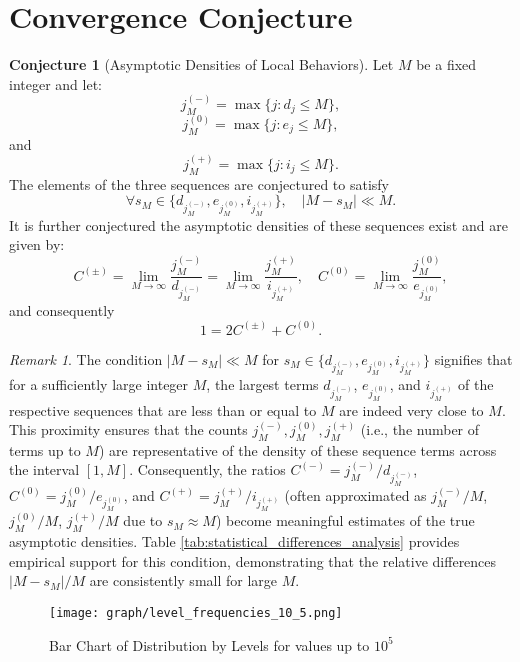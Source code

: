 \documentclass[]{article}
\theoremstyle{plain}%
\theoremstyle{definition}
\newtheorem{conj}{Conjecture}[section]
\theoremstyle{remark}
\newtheorem*{rem}{Remark}
\begin{document}
\section {Convergence Conjecture}
\begin{conj}[Asymptotic Densities of Local Behaviors]
	\label{conj:ratios}
	Let $M$ be a fixed integer and let:
	$$ j^{(-)}_M = \max \{ j :  d_j\le M\},$$
	$$ j^{(0)}_M = \max \{ j :  e_j\le M\},$$
	and
	$$ j^{(+)}_M = \max \{ j :  i_j\le M\}.$$
	The elements of the three sequences are conjectured to satisfy
	$$   \forall s_M \in \{d_{j^{(-)}_M},e_{j^{(0)}_M},i_{j^{(+)}_M}\}, \quad |M-s_M| \ll M. $$
	It is further conjectured the asymptotic densities of these sequences exist and are given by:
	$$ C^{(\pm)} = \lim_{M \to \infty} \frac{j^{(-)}_M}{d_{j^{(-)}_M}} = \lim_{M \to \infty}\frac{j^{(+)}_M}{i_{j^{(+)}_M}}, \quad C^{(0)} = \lim_{M \to \infty} \frac{j^{(0)}_M}{e_{j^{(0)}_M}},$$
	and consequently
	$$ 1 = 2C^{(\pm)} +C^{(0)}.$$
\end{conj}
\begin{rem}
	The condition $ |M-s_M| \ll M $ for $ s_M \in \{d_{j^{(-)}_M},e_{j^{(0)}_M},i_{j^{(+)}_M}\} $ signifies that for a sufficiently large integer $M$, the largest terms $d_{j^{(-)}_M}$, $e_{j^{(0)}_M}$, and $i_{j^{(+)}_M}$ of the respective sequences that are less than or equal to $M$ are indeed very close to $M$. This proximity ensures that the counts $j^{(-)}_M, j^{(0)}_M, j^{(+)}_M$ (i.e., the number of terms up to $M$) are representative of the density of these sequence terms across the interval $[1, M]$. Consequently, the ratios $C^{(-)} = j^{(-)}_M/d_{j^{(-)}_M}$, $C^{(0)} = j^{(0)}_M/e_{j^{(0)}_M}$, and $C^{(+)} = j^{(+)}_M/i_{j^{(+)}_M}$ (often approximated as $j^{(-)}_M/M$, $j^{(0)}_M/M$, $j^{(+)}_M/M$ due to $s_M \approx M$) become meaningful estimates of the true asymptotic densities. Table \ref{tab:statistical_differences_analysis} provides empirical support for this condition, demonstrating that the relative differences $|M-s_M|/M$ are consistently small for large $M$.
\end{rem}
\begin{figure}[h]
	\caption{Bar Chart of Distribution by Levels for values up to $10^5$}
	\centering
	\texttt{[image: graph/level\_frequencies\_10\_5.png]}
\end{figure}
\end{document}
